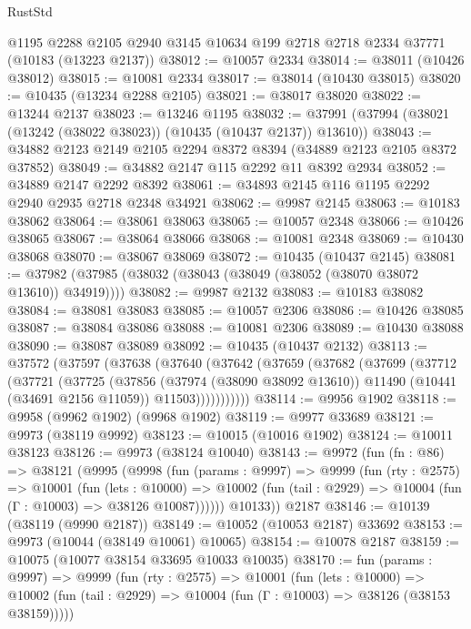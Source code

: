 \begin{lexlean}{RustStd}
\begin{coremodule}
    @1195
    @2288
    @2105
    @2940
    @3145
    @10634
    @199
    @2718
    @2718
    @2334
    @37771
    (@10183 (@13223 @2137))
@38012 := @10057 @2334
@38014 := @38011 (@10426 @38012)
@38015 := @10081 @2334
@38017 := @38014 (@10430 @38015)
@38020 := @10435 (@13234 @2288 @2105)
@38021 := @38017 @38020
@38022 := @13244 @2137
@38023 := @13246 @1195
@38032 := @37991 (@37994 (@38021 (@13242 (@38022 @38023)) (@10435 (@10437 @2137)) @13610))
@38043 := @34882 @2123 @2149 @2105 @2294 @8372 @8394 (@34889 @2123 @2105 @8372 @37852)
@38049 := @34882 @2147 @115 @2292 @11 @8392 @2934
@38052 := @34889 @2147 @2292 @8392
@38061 := @34893 @2145 @116 @1195 @2292 @2940 @2935 @2718 @2348 @34921
@38062 := @9987 @2145
@38063 := @10183 @38062
@38064 := @38061 @38063
@38065 := @10057 @2348
@38066 := @10426 @38065
@38067 := @38064 @38066
@38068 := @10081 @2348
@38069 := @10430 @38068
@38070 := @38067 @38069
@38072 := @10435 (@10437 @2145)
@38081 := @37982 (@37985 (@38032 (@38043 (@38049 (@38052 (@38070 @38072 @13610)) @34919))))
@38082 := @9987 @2132
@38083 := @10183 @38082
@38084 := @38081 @38083
@38085 := @10057 @2306
@38086 := @10426 @38085
@38087 := @38084 @38086
@38088 := @10081 @2306
@38089 := @10430 @38088
@38090 := @38087 @38089
@38092 := @10435 (@10437 @2132)
@38113 := @37572
    (@37597
      (@37638
        (@37640
          (@37642
            (@37659
              (@37682
                (@37699
                  (@37712
                    (@37721
                      (@37725
                        (@37856
                          (@37974 (@38090 @38092 @13610))
                          @11490
                          (@10441 (@34691 @2156 @11059))
                          @11503)))))))))))
@38114 := @9956 @1902
@38118 := @9958 (@9962 @1902) (@9968 @1902)
@38119 := @9977 @33689
@38121 := @9973 (@38119 @9992)
@38123 := @10015 (@10016 @1902)
@38124 := @10011 @38123
@38126 := @9973 (@38124 @10040)
@38143 := @9972
    (fun (fn : @86) =>
    @38121
      (@9995
        (@9998
          (fun (params : @9997) =>
          @9999
            (fun (rty : @2575) =>
            @10001
              (fun (lets : @10000) =>
              @10002 (fun (tail : @2929) => @10004 (fun (Γ : @10003) => @38126 @10087))))))
        @10133))
    @2187
@38146 := @10139 (@38119 (@9990 @2187))
@38149 := @10052 (@10053 @2187) @33692
@38153 := @9973 (@10044 (@38149 @10061) @10065)
@38154 := @10078 @2187
@38159 := @10075 (@10077 @38154 @33695 @10033 @10035)
@38170 := fun (params : @9997) =>
  @9999
    (fun (rty : @2575) =>
    @10001
      (fun (lets : @10000) =>
      @10002 (fun (tail : @2929) => @10004 (fun (Γ : @10003) => @38126 (@38153 @38159)))))

\end{coremodule}
\end{lexlean}
